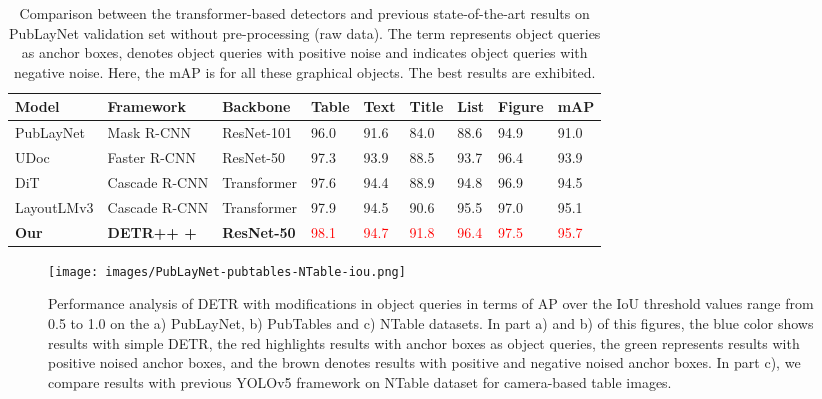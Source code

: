 \documentclass[sn-mathphys]{sn-jnl}\jyear{2021}\theoremstyle{thmstyleone}\newtheorem{theorem}{Theorem}\newtheorem{proposition}[theorem]{Proposition}\theoremstyle{thmstyletwo}\newtheorem{example}{Example}\newtheorem{remark}{Remark}\theoremstyle{thmstylethree}\newtheorem{definition}{Definition}\usepackage{amsmath}
\begin{document}
\begin{table*}
\tiny
\begin{center}
\caption{Comparison between the transformer-based detectors and previous state-of-the-art results on PubLayNet validation set \colorbox{red!25}{without pre-processing} (raw data). The term  represents object queries as anchor boxes,  denotes object queries with positive noise and  indicates object queries with negative noise. Here, the mAP is for all these graphical objects. The best results are exhibited.}\label{tab:PubLayNet2}\begin{tabular*}{\textwidth}
{@{\extracolsep{\fill}}lp{1.7cm}lllllll@{\extracolsep{\fill}}}
\toprule
\textbf{Model} &
\textbf{Framework} &
\textbf{Backbone} &
\textbf{Table} &
\textbf{Text} &
\textbf{Title} &
\textbf{List} &
\textbf{Figure} &
\textbf{mAP} \\
\midrule
PubLayNet \cite{PubLayNet3} &
Mask R-CNN  &
ResNet-101 &
96.0 & 91.6 & 84.0 & 88.6 & 94.9 & 91.0 \\ \midrule

UDoc \cite{UDoc39} &
Faster R-CNN &
ResNet-50 &
97.3 & 93.9 & 88.5 & 93.7 & 96.4 & 93.9 \\ \midrule

DiT \cite{Lidit78} & 
Cascade R-CNN &
Transformer &
97.6 & 94.4 & 88.9 & 94.8 & 96.9 & 94.5\\ \midrule

LayoutLMv3 \cite{layoutMV3} &
Cascade R-CNN &
 Transformer &
97.9 & 94.5 & 90.6 & 95.5 & 97.0 & 95.1 \\ \midrule

\textbf{Our } &
\textbf{DETR++ +} &
\textbf{ResNet-50} &
\textcolor{red}{98.1} &
\textcolor{red}{94.7} &
\textcolor{red}{91.8} &
\textcolor{red}{96.4} &
\textcolor{red}{97.5} &
\textcolor{red}{95.7} \\
\bottomrule
\end{tabular*}
\end{center}
\end{table*}


\begin{figure}[h!]
\centering
\texttt{[image: images/PubLayNet-pubtables-NTable-iou.png]}
\caption{Performance analysis of DETR with modifications in object queries in terms of AP over the IoU threshold values range from 0.5 to 1.0 on the a) PubLayNet, b) PubTables and c) NTable datasets. In part a) and b) of this figures, the blue color shows results with simple DETR, the red highlights results with anchor boxes as object queries, the green represents results with positive noised anchor boxes, and the brown denotes results with positive and negative noised anchor boxes. In part c), we compare results with previous YOLOv5 framework on NTable dataset for camera-based table images.}\label{fig:PubLayNet-pubtables-iou}
\end{figure}
\end{document}
